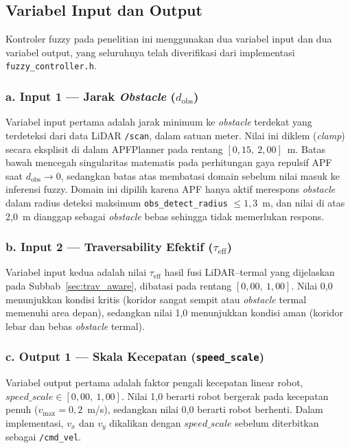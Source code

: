 \subsection{Variabel Input dan Output}
\label{sec:fuzzy_var}

Kontroler fuzzy pada penelitian ini menggunakan dua variabel input dan dua variabel output, yang seluruhnya telah diverifikasi dari implementasi \texttt{fuzzy\_controller.h}.

\subsubsection*{a. Input 1 --- Jarak \textit{Obstacle} ($d_\text{obs}$)}

Variabel input pertama adalah jarak minimum ke \textit{obstacle} terdekat yang terdeteksi dari data LiDAR \texttt{/scan}, dalam satuan meter. Nilai ini diklem (\textit{clamp}) secara eksplisit di dalam APFPlanner pada rentang $[0{,}15,\ 2{,}00]$~m. Batas bawah mencegah singularitas matematis pada perhitungan gaya repulsif APF saat $d_\text{obs} \to 0$, sedangkan batas atas membatasi domain sebelum nilai masuk ke inferensi fuzzy. Domain ini dipilih karena APF hanya aktif merespons \textit{obstacle} dalam radius deteksi maksimum \texttt{obs\_detect\_radius} $\leq 1{,}3$~m, dan nilai di atas 2,0~m dianggap sebagai \textit{obstacle} bebas sehingga tidak memerlukan respons.

\subsubsection*{b. Input 2 --- Traversability Efektif ($\tau_\text{eff}$)}

Variabel input kedua adalah nilai $\tau_\text{eff}$ hasil fusi LiDAR--termal yang dijelaskan pada Subbab~\ref{sec:trav_aware}, dibatasi pada rentang $[0{,}00,\ 1{,}00]$. Nilai 0,0 menunjukkan kondisi kritis (koridor sangat sempit atau \textit{obstacle} termal memenuhi area depan), sedangkan nilai 1,0 menunjukkan kondisi aman (koridor lebar dan bebas \textit{obstacle} termal).

\subsubsection*{c. Output 1 --- Skala Kecepatan (\texttt{speed\_scale})}

Variabel output pertama adalah faktor pengali kecepatan linear robot, $\mathit{speed\_scale} \in [0{,}00,\ 1{,}00]$. Nilai 1,0 berarti robot bergerak pada kecepatan penuh ($v_\text{max} = 0{,}2$~m/s), sedangkan nilai 0,0 berarti robot berhenti. Dalam implementasi, $v_x$ dan $v_y$ dikalikan dengan $\mathit{speed\_scale}$ sebelum diterbitkan sebagai \texttt{/cmd\_vel}.

